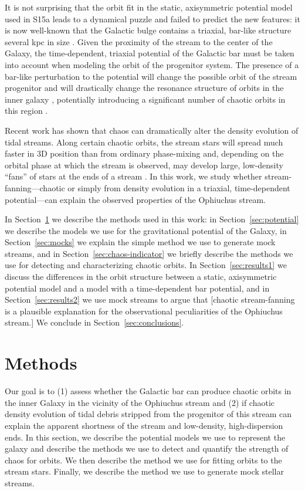 \documentclass[letterpaper,12pt,preprint]{aastex}
\begin{document}
It is not surprising that the orbit fit in the static, axisymmetric potential model used in S15a leads to a dynamical puzzle and failed to predict the new features: it is now well-known that the Galactic bulge contains a triaxial, bar-like structure several kpc in size \citep[e.g.,][]{blitzXX, wegg13, MANY}. Given the proximity of the stream to the center of the Galaxy, the time-dependent, triaxial potential of the Galactic bar must be taken into account when modeling the orbit of the progenitor system. The presence of a bar-like perturbation to the potential will change the possible orbit of the stream progenitor and will drastically change the resonance structure of orbits in the inner galaxy \citep{athanassoula, portail15b, zotos12}, potentially introducing a significant number of chaotic orbits in this region \citep{weinberg15}.

Recent work has shown that chaos can dramatically alter the density evolution of tidal streams. Along certain chaotic orbits, the stream stars will spread much faster in 3D position than from ordinary phase-mixing and, depending on the orbital phase at which the stream is observed, may develop large, low-density ``fans'' of stars at the ends of a stream \citep{apw15-chaos}. In this work, we study whether stream-fanning---chaotic or simply from density evolution in a triaxial, time-dependent potential---can explain the observed properties of the Ophiuchus stream. 

In Section~\ref{sec:method} we describe the methods used in this work: in Section~\ref{sec:potential} we describe the models we use for the gravitational potential of the Galaxy, in Section~\ref{sec:mocks} we explain the simple method we use to generate mock streams, and in Section~\ref{sec:chaos-indicator} we briefly describe the methods we use for detecting and characterizing chaotic orbits. In Section~\ref{sec:results1} we discuss the differences in the orbit structure between a static, axisymmetric potential model and a model with a time-dependent bar potential, and in Section~\ref{sec:results2} we use mock streams to argue that [chaotic stream-fanning is a plausible explanation for the observational peculiarities of the Ophiuchus stream.] We conclude in Section~\ref{sec:conclusions}.

\section{Methods}\label{sec:method}

Our goal is to (1) assess whether the Galactic bar can produce chaotic orbits in the inner Galaxy in the vicinity of the Ophiuchus stream and (2) if chaotic density evolution of tidal debris stripped from the progenitor of this stream can explain the apparent shortness of the stream and low-density, high-dispersion ends. In this section, we describe the potential models we use to represent the galaxy and describe the methods we use to detect and quantify the strength of chaos for orbits. We then describe the method we use for fitting orbits to the stream stars. Finally, we describe the method we use to generate mock stellar streams. 
\end{document}
